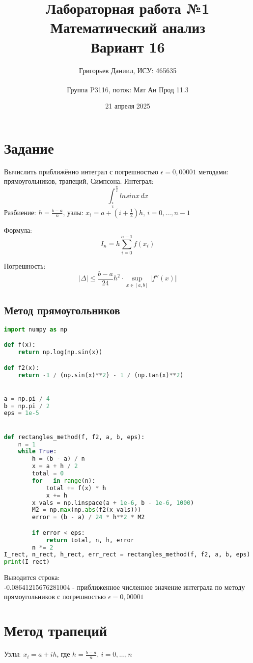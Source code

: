 \documentclass{article}
\title{Лабораторная работа №1\\Математический анализ\\Вариант 16}
\author{Григорьев Даниил, ИСУ: 465635\\\\ Группа P3116, поток: Мат Ан Прод 11.3}
\date{21 апреля 2025}
\begin{document}
\maketitle

\section*{Задание}
Вычислить приближённо интеграл с погрешностью
$\epsilon = 0,00001$
методами: прямоугольников, трапеций, Симпсона.
Интеграл:\[
\int_\frac{\pi}{4}^\frac{\pi}{2} lnsinx\, dx
\]
Разбиение: \( h = \frac{b - a}{n} \), узлы: \( x_i = a + \left(i + \frac{1}{2} \right) h \), \( i = 0, \dots, n-1 \)

Формула:
\[
I_n = h \sum_{i=0}^{n-1} f(x_i)
\]

Погрешность:
\[
|\Delta| \leq \frac{b - a}{24} h^2 \cdot \sup_{x \in [a,b]} |f''(x)|
\]
\subsection*{Метод прямоугольников}
\begin{lstlisting}[language=Python]
import numpy as np

def f(x):
    return np.log(np.sin(x))

def f2(x):  
    return -1 / (np.sin(x)**2) - 1 / (np.tan(x)**2)


a = np.pi / 4
b = np.pi / 2
eps = 1e-5


def rectangles_method(f, f2, a, b, eps):
    n = 1
    while True:
        h = (b - a) / n
        x = a + h / 2
        total = 0
        for _ in range(n):
            total += f(x) * h
            x += h
        x_vals = np.linspace(a + 1e-6, b - 1e-6, 1000)
        M2 = np.max(np.abs(f2(x_vals)))
        error = (b - a) / 24 * h**2 * M2

        if error < eps:
            return total, n, h, error
        n *= 2
I_rect, n_rect, h_rect, err_rect = rectangles_method(f, f2, a, b, eps)
print(I_rect)
\end{lstlisting}
Выводится строка:\\
-0.08641215676281004 - приближенное численное значение интеграла по методу прямоугольников с погрешностью $\epsilon = 0,00001$

\section*{Метод трапеций}
Узлы: \( x_i = a + i h \), где \( h = \frac{b - a}{n} \), \( i = 0, \dots, n \)
\end{document}
